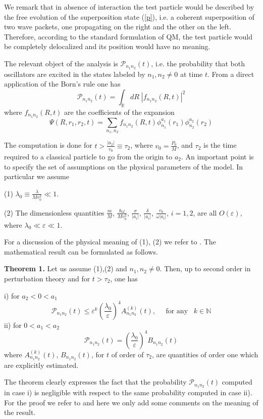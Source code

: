 \documentclass[12pt,reqno]{amsart}
\newcommand{\erre}{\mathbb{R}}
\newcommand{\natu}{\mathbb{N}}
\newcommand{\n}{\relax}
\newcommand{\vs}{\medskip}
\newcommand{\f}{\frac}
\newcommand{\be}{\begin{equation}}
\newcommand{\ee}{\end{equation}}
\numberwithin{equation}{section}
\begin{document}
\n
We remark that in absence of  interaction  the test particle would be described by  the free evolution of the superposition state (\ref{p}), i.e. a coherent superposition of two wave packets, one propagating on the right and the other on the left.  Therefore, according to the standard formulation of QM,  the test particle  would be completely delocalized and its position would have no meaning. 

\n  
 The relevant object of the analysis is $\mathcal{P}_{n_1 n_2} (t)$, i.e. the probability that both oscillators are excited in the states labeled by $n_1, n_2 \neq 0$ at time $t$. From a direct application of the Born's rule one has 
\be
 \mathcal{P}_{\!n_1 n_2 \!}(t)= \int_{\erre} \!\! dR \;  |f_{n_1 n_2} (R,t) |^2
 \ee
where $f_{n_1 n_2} (R,t)$ are the coefficients of the expansion
\be
\Psi (R,r_1,r_2,t) = \sum_{n_1,n_2} f_{n_1 n_2}(R,t) \phi^{a_1}_{n_1}(r_1) \phi^{a_2}_{n_2}(r_2)
\ee

\n 
The computation is done for $t>\f{|a_2|}{v_0}\equiv \tau_2$,  where $v_0=\f{P_0}{M}$, and $\tau_2$ is the time required to a classical particle to go  from the origin to $a_2$. An important point is to specify the set of assumptions on the physical parameters of the model. In particular we assume

\n
(1) $\lambda_0 \equiv \f{\lambda}{Mv_0^2} \ll 1$.

\n
(2) The dimensionless quantities $\f{m}{M}$, $\f{\hbar \omega}{Mv_0^2}$, $\f{\sigma}{|a_i|}$, $\f{\delta}{|a_i|}$, $\f{v_0}{\omega |a_i|}$, $i=1,2$, are all $O(\varepsilon)$, where $\lambda_0 \ll \varepsilon \ll 1$.

\n
For a discussion of the physical meaning of (1),  (2) we refer to \cite{dft}. The mathematical result can be formulated as follows. 

\vs
\n
 {\bf Theorem 1.} 
Let us assume (1),(2) and $n_1, n_2 \neq 0$. Then, up to second order in perturbation theory and for $t>\tau_2$,  one has

\n
i) for $a_2 < 0<a_1$ 
\be
\mathcal{P}_{n_1 n_2}(t) \leq \varepsilon^k \left(\! \f{\lambda_0}{\varepsilon} \! \right)^4  A^{(k)}_{n_1 n_2} (t), \;\;\;\;\;\mbox{for any} \;\;\;k \in \natu
\ee
ii) for $0<a_1 <a_2$
\be
\mathcal{P}_{n_1 n_2}(t)= \left(\! \f{\lambda_0}{\varepsilon} \! \right)^4 B_{n_1 n_2}(t)
\ee
where $A^{(k)}_{n_1 n_2} (t)$, $B_{n_1 n_2}(t)$, for $t$ of order of $\tau_2$, are quantities of order one which are explicitly estimated. 

 \vs
 \n
The theorem clearly expresses the fact that  the probability $\mathcal{P}_{n_1 n_2}(t)$ computed in case i) is negligible with respect to the same probability computed in case ii). For the proof we refer to \cite{dft}  and here we only add some comments on the meaning of the result.
\end{document}
